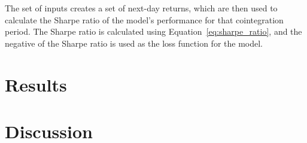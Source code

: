 \documentclass[12pt]{article}
\begin{document}
The set of inputs creates a set of next-day returns, which are then used to calculate the Sharpe ratio of the model's performance for that cointegration period. The Sharpe ratio is calculated using Equation~\ref{eq:sharpe_ratio}, and the negative of the Sharpe ratio is used as the loss function for the model.


\clearpage




\section{Results}

\clearpage





\section{Discussion}
\clearpage







\clearpage
\end{document}
